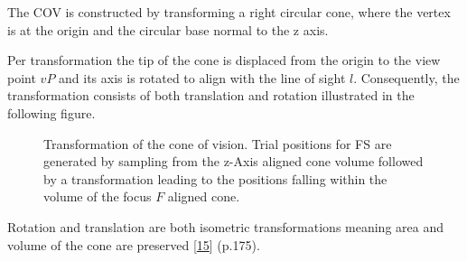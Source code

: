 \documentclass[letterpaper,10pt,english]{sphinxmanual}
\begin{document}
			\sphinxAtStartPar
			The COV is constructed by transforming a right circular cone, where the vertex is at the origin and the circular base normal to the z axis.
			
			\sphinxAtStartPar
			Per transformation the tip of the cone is displaced from the origin to the view point \(vP\) and its axis is rotated to align with the line of sight \(l\).
			Consequently, the transformation consists of both translation and rotation illustrated in the following figure.
			
			\begin{figure}[htbp]
			\centering
			\capstart
			
			\noindent{}
			\caption{Transformation of the cone of vision. Trial positions for FS are generated by sampling from the z-Axis aligned cone volume followed by a transformation leading to the positions falling within the volume of the focus \(F\) aligned cone.}\label{\detokenize{NBodySimulation/Initialization:id42}}\label{\detokenize{NBodySimulation/Initialization:fig-cone}}\end{figure}
			
			\sphinxAtStartPar
			Rotation and translation are both isometric transformations meaning area and volume of the cone are preserved {[}\hyperlink{cite.NBodySimulation/Appendix:id9}{15}{]} (p.175).
			
\end{document}
